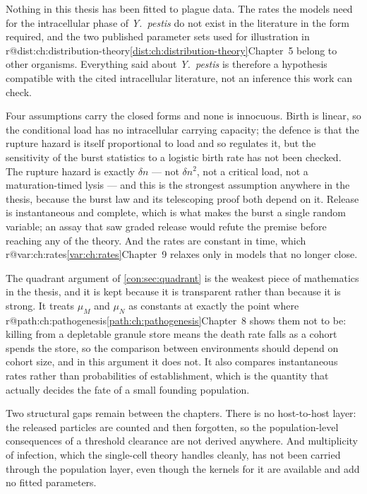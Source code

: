 \documentclass[11pt,a4paper]{report}
\makeatletter
\newcommand{\yp}{\textit{Y.~pestis}}
\providecommand{\mextref}[2]{%
  \ifcsname r@#1\endcsname\cref{#1}\else#2\fi}
\theoremstyle{plain}
\theoremstyle{remark}
\makeatother
\begin{document}
Nothing in this thesis has been fitted to plague data. The rates the models
need for the intracellular phase of \yp{} do not exist in the literature in
the form required, and the two published parameter sets used for illustration
in \mextref{dist:ch:distribution-theory}{Chapter~5} belong to other
organisms. Everything said about \yp{} is therefore a hypothesis compatible
with the cited intracellular literature, not an inference this work can
check.

Four assumptions carry the closed forms and none is innocuous. Birth is
linear, so the conditional load has no intracellular carrying capacity; the
defence is that the rupture hazard is itself proportional to load and so
regulates it, but the sensitivity of the burst statistics to a logistic birth
rate has not been checked. The rupture hazard is exactly $\delta n$ --- not
$\delta n^{2}$, not a critical load, not a maturation-timed lysis --- and
this is the strongest assumption anywhere in the thesis, because the burst
law and its telescoping proof both depend on it. Release is instantaneous and
complete, which is what makes the burst a single random variable; an assay
that saw graded release would refute the premise before reaching any of the
theory. And the rates are constant in time, which \mextref{var:ch:rates}{Chapter~9}
relaxes only in models that no longer close.

The quadrant argument of \cref{con:sec:quadrant} is the weakest piece of
mathematics in the thesis, and it is kept because it is transparent rather
than because it is strong. It treats $\mu_M$ and $\mu_N$ as constants at
exactly the point where \mextref{path:ch:pathogenesis}{Chapter~8} shows them
not to be: killing from a depletable granule store means the death rate falls
as a cohort spends the store, so the comparison between environments should
depend on cohort size, and in this argument it does not. It also compares
instantaneous rates rather than probabilities of establishment, which is the
quantity that actually decides the fate of a small founding population.

Two structural gaps remain between the chapters. There is no host-to-host
layer: the released particles are counted and then forgotten, so the
population-level consequences of a threshold clearance are not derived
anywhere. And multiplicity of infection, which the single-cell theory handles
cleanly, has not been carried through the population layer, even though the
kernels for it are available and add no fitted parameters.
\end{document}
